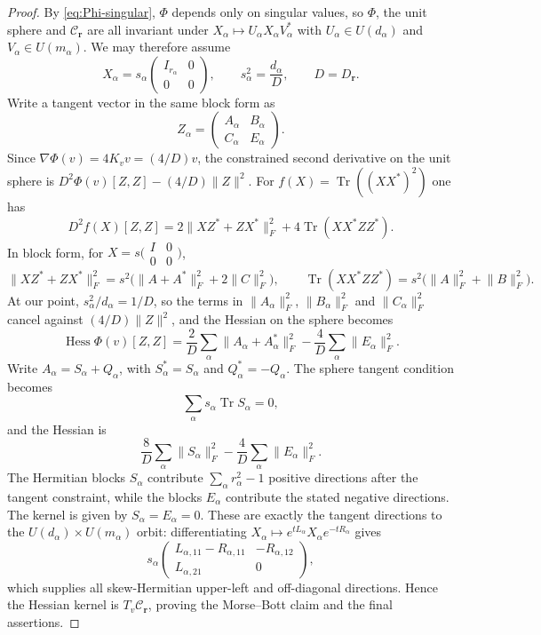 \documentclass{amsart}
\theoremstyle{remark}
\DeclareMathOperator{\Tr}{Tr}
\newcommand{\C}{\mathbb C}
\newcommand{\norm}[1]{\lVert #1\rVert}
\begin{document}
\begin{proof}
By \eqref{eq:Phi-singular}, $\Phi$ depends only on singular values, so $\Phi$, the unit sphere and
$\mathcal C_{\mathbf r}$ are all invariant under $X_\alpha\mapsto U_\alpha X_\alpha V_\alpha^*$ with
$U_\alpha\in U(d_\alpha)$ and $V_\alpha\in U(m_\alpha)$. We may therefore assume
\[
 X_\alpha=s_\alpha
 \begin{pmatrix}I_{r_\alpha}&0\\0&0\end{pmatrix},
 \qquad s_\alpha^2=\frac{d_\alpha}{D},\qquad D=D_{\mathbf r}.
\]
Write a tangent vector in the same block form as
\[
 Z_\alpha=\begin{pmatrix}A_\alpha&B_\alpha\\C_\alpha&E_\alpha\end{pmatrix}.
\]
Since $\nabla\Phi(v)=4K_vv=(4/D)v$, the constrained second derivative on the unit sphere is
$D^2\Phi(v)[Z,Z]-(4/D)\norm{Z}^2$. For $f(X)=\Tr((XX^*)^2)$ one has
\[
 D^2f(X)[Z,Z]
 =2\norm{XZ^*+ZX^*}_F^2+4\Tr(XX^*ZZ^*).
\]
In block form, for $X=s\bigl(\begin{smallmatrix}I&0\\0&0\end{smallmatrix}\bigr)$,
\[
 \norm{XZ^*+ZX^*}_F^2=s^2\bigl(\norm{A+A^*}_F^2+2\norm{C}_F^2\bigr),
 \qquad
 \Tr(XX^*ZZ^*)=s^2\bigl(\norm{A}_F^2+\norm{B}_F^2\bigr).
\]
At our point, $s_\alpha^2/d_\alpha=1/D$, so the terms in $\norm{A_\alpha}_F^2$, $\norm{B_\alpha}_F^2$
and $\norm{C_\alpha}_F^2$ cancel against $(4/D)\norm{Z}^2$, and the Hessian on the sphere becomes
\[
 \operatorname{Hess}\Phi(v)[Z,Z]
 =\frac2D\sum_\alpha\norm{A_\alpha+A_\alpha^*}_F^2
 -\frac4D\sum_\alpha\norm{E_\alpha}_F^2.
\]
Write $A_\alpha=S_\alpha+Q_\alpha$, with $S_\alpha^*=S_\alpha$ and
$Q_\alpha^*=-Q_\alpha$. The sphere tangent condition becomes
\[
 \sum_\alpha s_\alpha\Tr S_\alpha=0,
\]
and the Hessian is
\[
 \frac8D\sum_\alpha\norm{S_\alpha}_F^2
 -\frac4D\sum_\alpha\norm{E_\alpha}_F^2.
\]
The Hermitian blocks $S_\alpha$ contribute $\sum_\alpha r_\alpha^2-1$ positive directions after
the tangent constraint, while the blocks $E_\alpha$ contribute the stated negative directions. The kernel
is given by $S_\alpha=E_\alpha=0$. These are exactly the tangent directions to the
$U(d_\alpha)\times U(m_\alpha)$ orbit: differentiating
$X_\alpha\mapsto e^{tL_\alpha}X_\alpha e^{-tR_\alpha}$ gives
\[
 s_\alpha\begin{pmatrix}
 L_{\alpha,11}-R_{\alpha,11}&-R_{\alpha,12}\\
 L_{\alpha,21}&0
 \end{pmatrix},
\]
which supplies all skew-Hermitian upper-left and off-diagonal directions. Hence the Hessian kernel is
$T_v\mathcal C_{\mathbf r}$, proving the Morse--Bott claim and the final assertions.
\end{proof}
 
\end{document}
